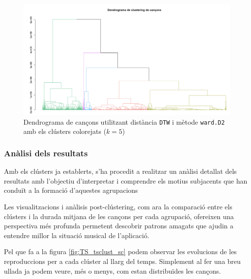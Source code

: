 \begin{figure}[H]
    \centering
    \includegraphics[width=\textwidth]{Images/4_clustering/time_series/dendrograma_colors.png}
    \caption{Dendrograma de cançons utilitzant distància \texttt{DTW} i mètode \texttt{ward.D2} amb els clústers colorejats ($k = 5$)}
    \label{fig:TS_dendrograma_colors}
\end{figure}

\subsubsection{Anàlisi dels resultats}

Amb els clústers ja establerts, s'ha procedit a realitzar un anàlisi detallat dels resultats amb l'objectiu d'interpretar i comprendre els motius subjacents que han conduït a la formació d'aquestes agrupacions

Les visualitzacions i anàlisis post-clústering, com ara la comparació entre els clústers i la durada mitjana de les cançons per cada agrupació, ofereixen una perspectiva més profunda permetent descobrir patrons amagats que ajudin a entendre millor la situació musical de l'aplicació.

Pel que fa a la figura \ref{fig:TS_tsclust_sc} podem observar les evolucions de les reproduccions per a cada clúster al llarg del temps.  Simplement al fer una breu ullada ja podem veure, més o menys, com estan distribuïdes les cançons. \\

